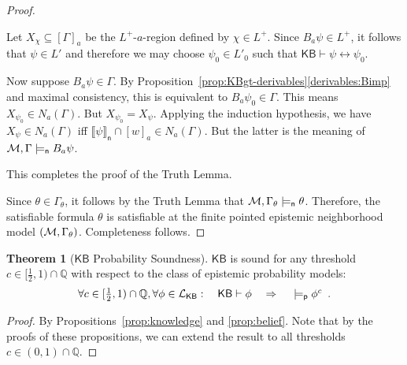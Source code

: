 \documentclass[12pt]{article}
\theoremstyle{definition}
\newtheorem{theorem}{Theorem}[section]
\newcommand{\Rat}{\mathbb{Q}}  %
\newcommand{\M}{{\cal M}}      %
\newcommand{\Lang}{{\cal L}}   %
\newcommand{\KB}{{\mathsf{KB}}}                        %
\newcommand{\modelsn}{\models_{\mathsf{n}}}                  %
\newcommand{\semn}[1]{\llbracket{#1}\rrbracket_{\mathsf{n}}} %
\newcommand{\modelsp}{\models_{\mathsf{p}}}                  %
\begin{document}
\begin{proof}
\begin{itemize}
    Let $X_\chi\subseteq[\Gamma]_a$ be the $L^+$-$a$-region defined
    by $\chi\in L^+$.  Since $B_a\psi\in L^+$, it follows that
    $\psi\in L'$ and therefore we may choose
    $\psi_0\in L'_0$
    such that $\KB\vdash\psi\leftrightarrow\psi_0$.

    Now suppose $B_a\psi\in\Gamma$. By
    Proposition~\ref{prop:KBgt-derivables}\eqref{derivables:Bimp} and maximal consistency,
    this is equivalent to $B_a\psi_0\in\Gamma$.  This means
    $X_{\psi_0}\in N_a(\Gamma)$.  But $X_{\psi_0}=X_{\psi}$.  Applying the
    induction hypothesis, we have 
    $X_{\psi}\in N_a(\Gamma)$ iff $\semn{\psi}\cap[w]_a\in N_a(\Gamma)$.
    But the latter is the meaning of $\M,\Gamma\modelsn B_a\psi$.
  \end{itemize}
  This completes the proof of the Truth Lemma.

  Since
  $\theta\in\Gamma_\theta$, it follows by the Truth
  Lemma that $\M,\Gamma_\theta\modelsn\theta$.  Therefore, the
  satisfiable formula $\theta$ is satisfiable at the finite pointed
  epistemic neighborhood model $(\M,\Gamma_\theta)$.
  Completeness follows.
\end{proof}

\begin{theorem}[$\KB$ Probability Soundness]
  $\KB$ is sound for any threshold $c\in[\frac 12,1)\cap\Rat$ with respect to the class of epistemic
  probability models:
  \[
  \textstyle \forall c\in[\frac 12,1)
  \cap\Rat,\forall\phi\in\Lang_\KB:\quad
  \KB\vdash\phi
   \quad\Rightarrow\quad
  {}\modelsp\phi^c \enspace.
  \]
\end{theorem}
\begin{proof}
  By Propositions~\ref{prop:knowledge} and \ref{prop:belief}.  Note that by the proofs of these
  propositions, we can extend the result to all thresholds $c\in(0,1)\cap\Rat$.
\end{proof}
\end{document}
